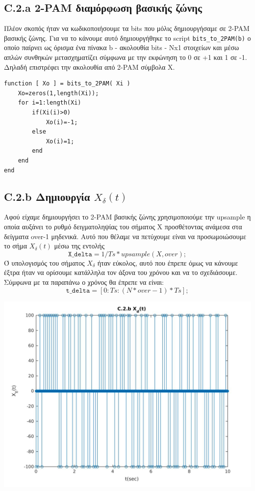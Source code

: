 \documentclass[11pt]{article}
\begin{document}
    \subsection*{C.2.a 2-PAM διαμόρφωση βασικής ζώνης}
    Πλέον σκοπός ήταν να κωδικοποιήσουμε τα bits που μόλις δημιουργήσαμε σε 2-PAM βασικής ζώνης. Για να το κάνουμε αυτό δημιουργήθηκε το script \texttt{bits\_to\_2PAM(b)} ο οποίο παίρνει ως όρισμα ένα πίνακα b - ακολουθία bits - Νx1 στοιχείων και μέσω απλών συνθηκών μετασχηματίζει σύμφωνα με την εκφώνηση το 0 σε +1 και 1 σε -1. Δηλαδή επιστρέφει την ακολουθία από 2-PAM σύμβολα X.
    
\begin{lstlisting}[caption = {\texttt{bits\_to\_2PAM.m}}]
function [ Xo ] = bits_to_2PAM( Xi )
    Xo=zeros(1,length(Xi));    
    for i=1:length(Xi)    
        if(Xi(i)>0)          
            Xo(i)=-1;        
        else
            Xo(i)=1;    
        end
    end
end
\end{lstlisting}
    
    
    \subsection*{C.2.b Δημιουργία $X_δ(t)$}
    Αφού είχαμε δημιουργήσει το 2-PAM βασικής ζώνης χρησιμοποιούμε την upsample η οποία αυξάνει το ρυθμό δειγματοληψίας του σήματος Χ προσθέτοντας ανάμεσα στα δείγματα over-1 μηδενικά. Αυτό που θέλαμε να πετύχουμε είναι να προσωμοιώσουμε το σήμα $X_δ(t)$ μέσω της εντολής 
    $$\texttt{X\_delta} = 1/T s * upsample(X, over);$$
    Ό υπολογισμός του σήματος $X_δ$ ήταν εύκολος, αυτό που έπρεπε όμως να κάνουμε έξτρα ήταν να ορίσουμε κατάλληλα τον άξονα του χρόνου και να το σχεδιάσουμε. Σύμφωνα με τα παραπάνω ο χρόνος θα έπρεπε να είναι:
    $$\texttt{t\_delta} = [ 0 : Ts : (N*over-1)*Ts ];$$

    \begin{center}
        \includegraphics[scale=0.35]{photos/C.2.b X_d(t).jpg}
    \end{center} 
    
\end{document}
